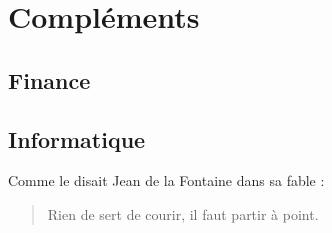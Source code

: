 \documentclass[a4paper,12pt]{report}
\begin{document}
\chapter{Compl\'ements}
\section{Finance}
\section{Informatique}

Comme le disait Jean de la Fontaine dans sa fable :
\begin{quote}
Rien de sert de courir, il faut partir à point.
\end{quote}
\end{document}

